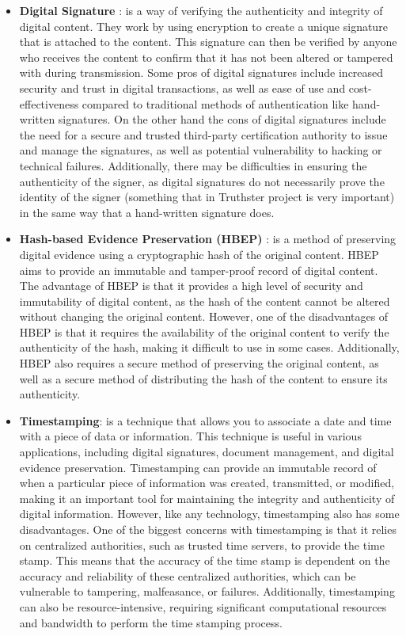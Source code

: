 \documentclass[target=mst,aauheader=]{thud}
\begin{document}
\begin{itemize}

    \item \textbf{Digital Signature} \cite{digitalSignature}: is a way of verifying the authenticity and integrity of digital content. They work by using encryption to create a unique signature that is attached to the content. This signature can then be verified by anyone who receives the content to confirm that it has not been altered or tampered with during transmission. Some pros of digital signatures include increased security and trust in digital transactions, as well as ease of use and cost-effectiveness compared to traditional methods of authentication like hand-written signatures. On the other hand the cons of digital signatures include the need for a secure and trusted third-party certification authority to issue and manage the signatures, as well as potential vulnerability to hacking or technical failures. Additionally, there may be difficulties in ensuring the authenticity of the signer, as digital signatures do not necessarily prove the identity of the signer (something that in Truthster project is very important) in the same way that a hand-written signature does.
    \item \textbf{Hash-based Evidence Preservation (HBEP)} \cite{hbep}: is a method of preserving digital evidence using a cryptographic hash of the original content. HBEP aims to provide an immutable and tamper-proof record of digital content. The advantage of HBEP is that it provides a high level of security and immutability of digital content, as the hash of the content cannot be altered without changing the original content. However, one of the disadvantages of HBEP is that it requires the availability of the original content to verify the authenticity of the hash, making it difficult to use in some cases. Additionally, HBEP also requires a secure method of preserving the original content, as well as a secure method of distributing the hash of the content to ensure its authenticity.
    \item \textbf{Timestamping}: is a technique that allows you to associate a date and time with a piece of data or information. This technique is useful in various applications, including digital signatures, document management, and digital evidence preservation. Timestamping can provide an immutable record of when a particular piece of information was created, transmitted, or modified, making it an important tool for maintaining the integrity and authenticity of digital information. However, like any technology, timestamping also has some disadvantages. One of the biggest concerns with timestamping is that it relies on centralized authorities, such as trusted time servers, to provide the time stamp. This means that the accuracy of the time stamp is dependent on the accuracy and reliability of these centralized authorities, which can be vulnerable to tampering, malfeasance, or failures. Additionally, timestamping can also be resource-intensive, requiring significant computational resources and bandwidth to perform the time stamping process.

\end{itemize}
\end{document}
